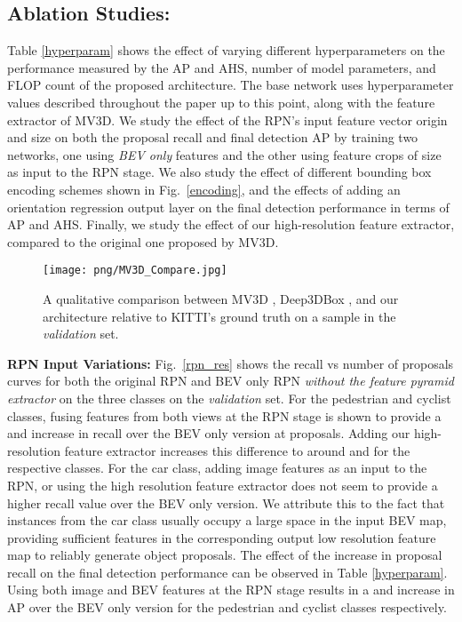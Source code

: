 \documentclass[letterpaper, 10 pt, conference]{ieeeconf}
\newcommand{\fig}[1]{Fig.~\ref{#1}}
\begin{document}
\subsection{Ablation Studies:}
Table \ref{hyperparam} shows the effect of varying different hyperparameters on the performance measured by the AP and AHS, number of model parameters, and FLOP count of the proposed architecture. The base network uses hyperparameter values described throughout the paper up to this point, along with the feature extractor of MV3D. We study the effect of the RPN's input feature vector origin and size on both the proposal recall and final detection AP by training two networks, one using \textit{BEV only} features and the other using feature crops of size  as input to the RPN stage. We also study the effect of different bounding box encoding schemes shown in \fig{encoding}, and the effects of adding an orientation regression output layer on the final detection performance in terms of AP and AHS. Finally, we study the effect of our high-resolution feature extractor, compared to the original one proposed by MV3D.\\
\begin{figure}[t] 
\begin{center}
\texttt{[image: png/MV3D\_Compare.jpg]}
\end{center}
\caption{A qualitative comparison between MV3D \cite{cvpr17chen}, Deep3DBox \cite{mousavian20163d}, and our architecture relative to KITTI's ground truth on a sample in the \textit{validation} set.}
\label{res_comp}
\end{figure}

\noindent \textbf{RPN Input Variations:} \fig{rpn_res} shows the recall vs number of proposals curves for both the original RPN and BEV only RPN \textit{without the feature pyramid extractor} on the three classes on the \textit{validation} set. For the pedestrian and cyclist classes, fusing features from both views at the RPN stage is shown to provide a \textbf{} and\textbf{ } increase in recall over the BEV only version at  proposals.  Adding our high-resolution feature extractor increases this difference to around \textbf{} and \textbf{} for the respective classes. For the car class, adding image features as an input to the RPN, or using the high resolution feature extractor does not seem to provide a higher recall value over the BEV only version. We attribute this to the fact that instances from the car class usually occupy a large space in the input BEV map, providing sufficient features in the corresponding output low resolution feature map to reliably generate object proposals. The effect of the increase in proposal recall on the final detection performance can be observed in Table \ref{hyperparam}. Using both image and BEV features at the RPN stage results in a  and  increase in AP over the BEV only version for the pedestrian and cyclist classes respectively.\\ 
\end{document}
